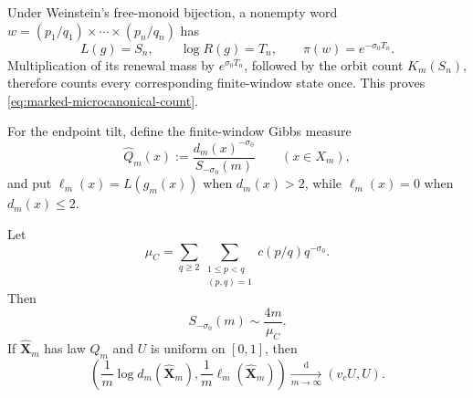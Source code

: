 Under Weinstein's free-monoid bijection, a nonempty word
\(w=(p_1/q_1)\times\cdots\times(p_n/q_n)\) has
\[
 L(g)=S_n,\qquad \log R(g)=T_n,
 \qquad \pi(w)=e^{-\sigma_0T_n}.
\]
Multiplication of its renewal mass by \(e^{\sigma_0T_n}\), followed by the
orbit count \(K_m(S_n)\), therefore counts every corresponding finite-window
state once.  This proves \eqref{eq:marked-microcanonical-count}.

For the endpoint tilt, define the finite-window Gibbs measure
\[
 \widehat Q_m(x):=\frac{d_m(x)^{-\sigma_0}}{S_{-\sigma_0}(m)}
 \qquad(x\in X_m),
\]
and put \(\ell_m(x)=L(g_m(x))\) when \(d_m(x)>2\), while
\(\ell_m(x)=0\) when \(d_m(x)\le2\).

\begin{theorem}
\label{thm:critical-finite-window-gibbs}
Let
\[
 \mu_C=
 \sum_{q\ge2}\sum_{\substack{1\le p<q\\(p,q)=1}}
 c(p/q)q^{-\sigma_0}.
\]
Then
\begin{equation}
 S_{-\sigma_0}(m)\sim\frac{4m}{\mu_C}.
 \label{eq:critical-linear-finite-size}
\end{equation}
If \(\widehat{\mathbf X}_m\) has law \(\widehat Q_m\) and
\(U\) is uniform on \([0,1]\), then
\begin{equation}
 \left(
  \frac1m\log d_m(\widehat{\mathbf X}_m),
  \frac1m\ell_m(\widehat{\mathbf X}_m)
 \right)
 \xrightarrow[m\to\infty]{\mathrm d}(v_cU,U).
 \label{eq:critical-uniform-coexistence}
\end{equation}
\end{theorem}


